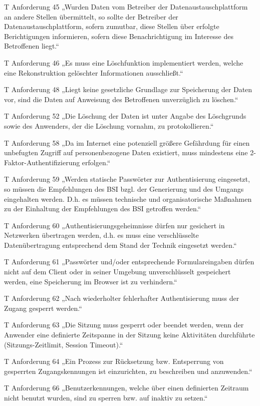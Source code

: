 T Anforderung 45
„Wurden Daten vom Betreiber der Datenaustauschplattform an andere Stellen übermittelt, so sollte der Betreiber der Datenaustauschplattform, sofern zumutbar, diese Stellen über erfolgte Berichtigungen informieren, sofern diese Benachrichtigung im Interesse des Betroffenen liegt.“

T Anforderung 46
„Es muss eine Löschfunktion implementiert werden, welche eine Rekonstruktion gelöschter Informationen ausschließt.“

T Anforderung 48
„Liegt keine gesetzliche Grundlage zur Speicherung der Daten vor, sind die Daten auf Anweisung des Betroffenen unverzüglich zu löschen.“

T Anforderung 52
„Die Löschung der Daten ist unter Angabe des Löschgrunds sowie des Anwenders, der die Löschung vornahm, zu protokollieren.“

T Anforderung 58
„Da im Internet eine potenziell größere Gefährdung für einen unbefugten Zugriff auf personenbezogene Daten existiert, muss mindestens eine 2-Faktor-Authentifizierung erfolgen.“

T Anforderung 59
„Werden statische Passwörter zur Authentisierung eingesetzt, so müssen die Empfehlungen des BSI bzgl. der Generierung und des Umgangs eingehalten werden. D.h. es müssen technische und organisatorische Maßnahmen zu der Einhaltung der Empfehlungen des BSI getroffen werden.“

T Anforderung 60
„Authentisierungsgeheimnisse dürfen nur gesichert in Netzwerken übertragen werden, d.h. es muss eine verschlüsselte Datenübertragung entsprechend dem Stand der Technik eingesetzt werden.“

T Anforderung 61
„Passwörter und/oder entsprechende Formulareingaben dürfen nicht auf dem Client oder in seiner Umgebung unverschlüsselt gespeichert werden, eine Speicherung im Browser ist zu verhindern.“

T Anforderung 62
„Nach wiederholter fehlerhafter Authentisierung muss der Zugang gesperrt werden.“

T Anforderung 63
„Die Sitzung muss gesperrt oder beendet werden, wenn der Anwender eine definierte Zeitspanne in der Sitzung keine Aktivitäten durchführte (Sitzungs-Zeitlimit, Session Timeout).“

T Anforderung 64
„Ein Prozess zur Rücksetzung bzw. Entsperrung von gesperrten Zugangskennungen ist einzurichten, zu beschreiben und anzuwenden.“

T Anforderung 66
„Benutzerkennungen, welche über einen definierten Zeitraum nicht benutzt wurden, sind zu sperren bzw. auf inaktiv zu setzen.“

